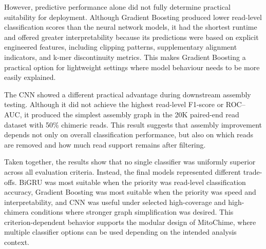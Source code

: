 However, predictive performance alone did not fully determine practical suitability for deployment. Although Gradient Boosting produced lower read-level classification scores than the neural network models, it had the shortest runtime and offered greater interpretability because its predictions were based on explicit engineered features, including clipping patterns, supplementary alignment indicators, and k-mer discontinuity metrics. This makes Gradient Boosting a practical option for lightweight settings where model behaviour needs to be more easily explained.

The CNN showed a different practical advantage during downstream assembly testing. Although it did not achieve the highest read-level F1-score or ROC--AUC, it produced the simplest assembly graph in the 20K paired-end read dataset with 50\% chimeric reads. This result suggests that assembly improvement depends not only on overall classification performance, but also on which reads are removed and how much read support remains after filtering.

Taken together, the results show that no single classifier was uniformly superior across all evaluation criteria. Instead, the final models represented different trade-offs. BiGRU was most suitable when the priority was read-level classification accuracy, Gradient Boosting was most suitable when the priority was speed and interpretability, and CNN was useful under selected high-coverage and high-chimera conditions where stronger graph simplification was desired. This criterion-dependent behavior supports the modular design of MitoChime, where multiple classifier options can be used depending on the intended analysis context.